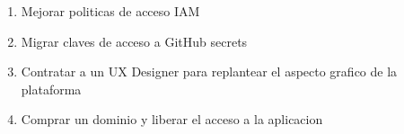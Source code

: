 
\begin{enumerate}
    \item Mejorar politicas de acceso IAM
    \item Migrar claves de acceso a GitHub secrets
    \item Contratar a un UX Designer para replantear el aspecto grafico de la plataforma
    \item Comprar un dominio y liberar el acceso a la aplicacion
\end{enumerate}
